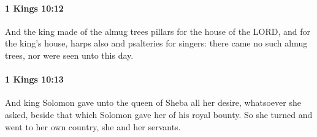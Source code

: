 		\paragraph{1 Kings 10:12} %
			\label{1KINGS-10-12}

			And the king made of the almug trees pillars for the house of the LORD, and for the king’s house, harps also and psalteries for singers: there came no such almug trees, nor were seen unto this day.


		\paragraph{1 Kings 10:13} %
			\label{1KINGS-10-13}

			And king Solomon gave unto the queen of Sheba all her desire, whatsoever she asked, beside that which Solomon gave her of his royal bounty. So she turned and went to her own country, she and her servants.

